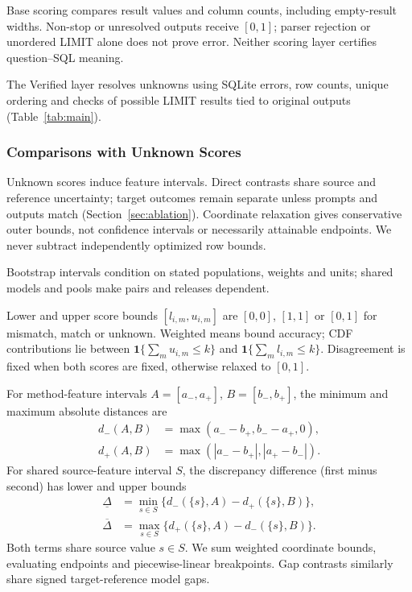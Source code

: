 Base scoring compares result values and column counts, including empty-result widths. Non-stop or unresolved outputs receive $[0,1]$; parser rejection or unordered LIMIT alone does not prove error. Neither scoring layer certifies question--SQL meaning.

The Verified layer resolves unknowns using SQLite errors, row counts, unique ordering and checks of possible LIMIT results tied to original outputs (Table~\ref{tab:main}). 
\subsubsection{Comparisons with Unknown Scores}

Unknown scores induce feature intervals. Direct contrasts share source and reference uncertainty; target outcomes remain separate unless prompts and outputs match (Section~\ref{sec:ablation}). Coordinate relaxation gives conservative outer bounds, not confidence intervals or necessarily attainable endpoints. We never subtract independently optimized row bounds.

Bootstrap intervals condition on stated populations, weights and units; shared models and pools make pairs and releases dependent.

Lower and upper score bounds $[l_{i,m},u_{i,m}]$ are $[0,0]$, $[1,1]$ or $[0,1]$ for mismatch, match or unknown. Weighted means bound accuracy; CDF contributions lie between $\mathbf1\{\sum_m u_{i,m}\le k\}$ and $\mathbf1\{\sum_m l_{i,m}\le k\}$. Disagreement is fixed when both scores are fixed, otherwise relaxed to $[0,1]$. 

For method-feature intervals $A=[a_-,a_+]$, $B=[b_-,b_+]$, the minimum and maximum absolute distances are
\begin{align}
 d_-(A,B)&=\max(a_- - b_+,b_- - a_+,0),\\
 d_+(A,B)&=\max(|a_- - b_+|,|a_+ - b_-|).
\end{align}
For shared source-feature interval $S$, the discrepancy difference (first minus second) has lower and upper bounds
\begin{align}
 \underline\Delta&=\min_{s\in S}\{d_-(\{s\},A)-d_+(\{s\},B)\},\\
 \overline\Delta&=\max_{s\in S}\{d_+(\{s\},A)-d_-(\{s\},B)\}.
 \label{eq:shared-contrast}
\end{align}
Both terms share source value $s\in S$. We sum weighted coordinate bounds, evaluating endpoints and piecewise-linear breakpoints. Gap contrasts similarly share signed target-reference model gaps.

